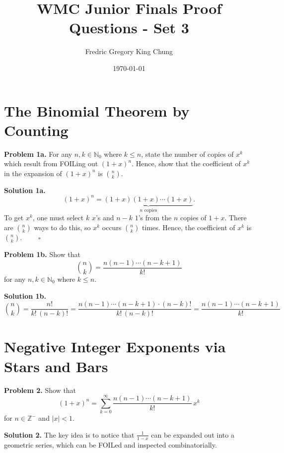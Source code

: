 \documentclass{article}
\title{WMC Junior Finals Proof Questions - Set 3}
\author{Fredric Gregory King Chung}
\date{\today}
\begin{document}
\maketitle

\section{The Binomial Theorem by Counting}

\noindent\textbf{Problem 1a.} For any $n, k \in \mathbb{N}_0$ where $k \leq n$, state the number of copies of $x^k$ which result from FOILing out $(1+x)^n$. Hence, show that the coefficient of $x^k$ in the expansion of $(1+x)^n$ is $\binom{n}{k}$.

\bigskip

\noindent\textbf{Solution 1a.}
\[
    (1+x)^n = \underbrace{(1+x)(1+x)\cdots(1+x)}_{n \text{ copies}}.
\]
To get $x^k$, one must select $k$ $x$'s and $n-k$ $1$'s from the $n$ copies of $1+x$. There are $\binom{n}{k}$ ways to do this, so $x^k$ occurs $\binom{n}{k}$ times. Hence, the coefficient of $x^k$ is $\binom{n}{k}$. $\qquad \square$

\bigskip

\noindent\textbf{Problem 1b.} Show that
\[
    \binom{n}{k} = \frac{n(n-1)\cdots(n-k+1)}{k!}
\]
for any $n, k \in \mathbb{N}_0$ where $k \leq n$.

\bigskip

\noindent\textbf{Solution 1b.}
\[
    \binom{n}{k}
    = \frac{n!}{k!\,(n-k)!}
    = \frac{n(n-1)\cdots(n-k+1) \cdot (n-k)!}{k!\,(n-k)!}
    = \boxed{\frac{n(n-1)\cdots(n-k+1)}{k!}}
\]

\section{Negative Integer Exponents via Stars and Bars}

\noindent\textbf{Problem 2.} Show that
\[
    (1+x)^n = \sum_{k=0}^{\infty} \frac{n(n-1)\cdots(n-k+1)}{k!}\, x^k
\]
for $n \in \mathbb{Z}^-$ and $|x| < 1$.

\bigskip

\noindent\textbf{Solution 2.} The key idea is to notice that $\frac{1}{1-x}$ can be expanded out into a geometric series, which can be FOILed and inspected combinatorially.

\medskip
\end{document}
